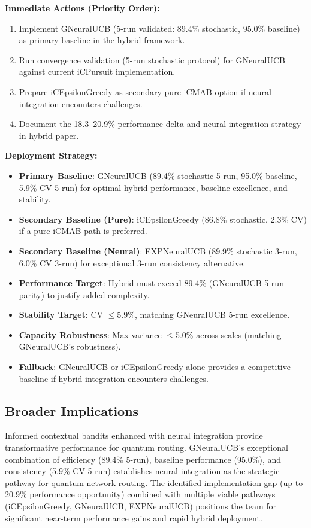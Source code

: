 \documentclass[12pt,a4paper]{article}
\begin{document}
\textbf{Immediate Actions (Priority Order):}
\begin{enumerate}
\item Implement GNeuralUCB (5-run validated: 89.4\% stochastic, 95.0\% baseline) as primary baseline in the hybrid framework.
\item Run convergence validation (5-run stochastic protocol) for GNeuralUCB against current iCPursuit implementation.
\item Prepare iCEpsilonGreedy as secondary pure-iCMAB option if neural integration encounters challenges.
\item Document the 18.3--20.9\% performance delta and neural integration strategy in hybrid paper.
\end{enumerate}

\textbf{Deployment Strategy:}
\begin{itemize}
\item \textbf{Primary Baseline}: GNeuralUCB (89.4\% stochastic 5-run, 95.0\% baseline, 5.9\% CV 5-run) for optimal hybrid performance, baseline excellence, and stability.
\item \textbf{Secondary Baseline (Pure)}: iCEpsilonGreedy (86.8\% stochastic, 2.3\% CV) if a pure iCMAB path is preferred.
\item \textbf{Secondary Baseline (Neural)}: EXPNeuralUCB (89.9\% stochastic 3-run, 6.0\% CV 3-run) for exceptional 3-run consistency alternative.
\item \textbf{Performance Target}: Hybrid must exceed 89.4\% (GNeuralUCB 5-run parity) to justify added complexity.
\item \textbf{Stability Target}: CV $\leq$5.9\%, matching GNeuralUCB 5-run excellence.
\item \textbf{Capacity Robustness}: Max variance $\leq$5.0\% across scales (matching GNeuralUCB's robustness).
\item \textbf{Fallback}: GNeuralUCB or iCEpsilonGreedy alone provides a competitive baseline if hybrid integration encounters challenges.
\end{itemize}

\subsection{Broader Implications}

Informed contextual bandits enhanced with neural integration provide transformative performance for quantum routing. GNeuralUCB's exceptional combination of efficiency (89.4\% 5-run), baseline performance (95.0\%), and consistency (5.9\% CV 5-run) establishes neural integration as the strategic pathway for quantum network routing. The identified implementation gap (up to 20.9\% performance opportunity) combined with multiple viable pathways (iCEpsilonGreedy, GNeuralUCB, EXPNeuralUCB) positions the team for significant near-term performance gains and rapid hybrid deployment.
\end{document}

